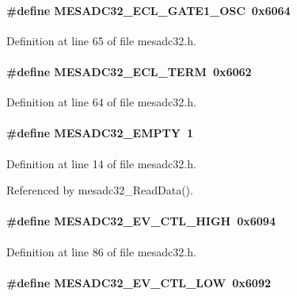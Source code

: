 \paragraph[{MESADC32\_\-ECL\_\-GATE1\_\-OSC}]{\setlength{\rightskip}{0pt plus 5cm}\#define MESADC32\_\-ECL\_\-GATE1\_\-OSC~0x6064}\hfill\label{mesadc32_8h_a7b5bae93e6922723f97fd0c0099bee4a}


Definition at line 65 of file mesadc32.h.
\paragraph[{MESADC32\_\-ECL\_\-TERM}]{\setlength{\rightskip}{0pt plus 5cm}\#define MESADC32\_\-ECL\_\-TERM~0x6062}\hfill\label{mesadc32_8h_a886891679d3939ac1d734cb20f50f3d4}


Definition at line 64 of file mesadc32.h.
\paragraph[{MESADC32\_\-EMPTY}]{\setlength{\rightskip}{0pt plus 5cm}\#define MESADC32\_\-EMPTY~1}\hfill\label{mesadc32_8h_ae466e192a29740bf9c6ed2ecd509d20d}


Definition at line 14 of file mesadc32.h.

Referenced by mesadc32\_\-ReadData().
\paragraph[{MESADC32\_\-EV\_\-CTL\_\-HIGH}]{\setlength{\rightskip}{0pt plus 5cm}\#define MESADC32\_\-EV\_\-CTL\_\-HIGH~0x6094}\hfill\label{mesadc32_8h_a14a62338835e6fcc86d4ed6c8e331a03}


Definition at line 86 of file mesadc32.h.
\paragraph[{MESADC32\_\-EV\_\-CTL\_\-LOW}]{\setlength{\rightskip}{0pt plus 5cm}\#define MESADC32\_\-EV\_\-CTL\_\-LOW~0x6092}\hfill\label{mesadc32_8h_aa2969cc1e74c7f00d23b1b92c988ccb0}



